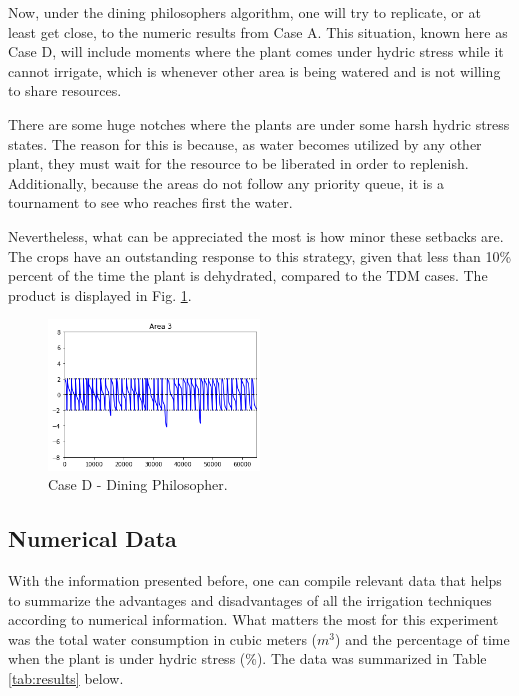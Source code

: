 \documentclass[12pt]{article}
\begin{document}
Now, under the dining philosophers algorithm, one will try to replicate, or at least get close, to the numeric results from Case A. This situation, known here as Case D, will include moments where the plant comes under hydric stress while it cannot irrigate, which is whenever other area is being watered and is not willing to share resources.

There are some huge notches where the plants are under some harsh hydric stress states. The reason for this is because, as water becomes utilized by any other plant, they must wait for the resource to be liberated in order to replenish. Additionally, because the areas do not follow any priority queue, it is a tournament to see who reaches first the water.

Nevertheless, what can be appreciated the most is how minor these setbacks are. The crops have an outstanding response to this strategy, given that less than 10\% percent of the time the plant is dehydrated, compared to the TDM cases. The product is displayed in Fig. \ref{fig:case_d}.

\begin{figure}[ht]
\includegraphics[width=0.5\textwidth]{case_d}
\centering
\caption{Case D - Dining Philosopher.}
\label{fig:case_d}
\end{figure}

\subsection{Numerical Data}

With the information presented before, one can compile relevant data that helps to summarize the advantages and disadvantages of all the irrigation techniques according to numerical information. What matters the most for this experiment was the total water consumption in cubic meters ($m^3$) and the percentage of time when the plant is under hydric stress (\%). The data was summarized in Table \ref{tab:results} below.
\end{document}
